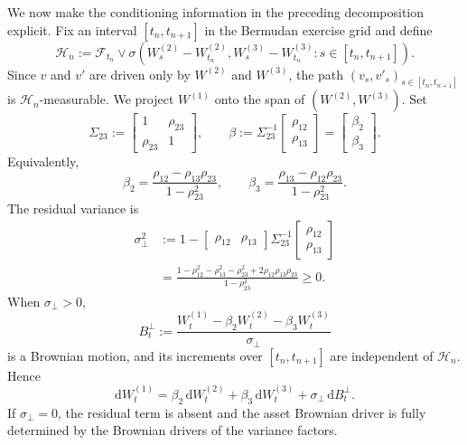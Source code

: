 \documentclass[pdflatex,sn-mathphys-num]{sn-jnl}
\theoremstyle{thmstyleone}%
\theoremstyle{thmstylethree}%
\theoremstyle{thmstyletwo}%
\newcommand{\dd}{\mathrm d}
\newcommand{\F}{\mathcal F}
\begin{document}
We now make the conditioning information in the preceding decomposition explicit.
Fix an interval $[t_n,t_{n+1}]$ in the Bermudan exercise grid and define
$$
\mathcal H_n
:=
\F_{t_n}
\vee
\sigma\!\left(
W_s^{(2)}-W_{t_n}^{(2)},
W_s^{(3)}-W_{t_n}^{(3)}
: s\in[t_n,t_{n+1}]
\right).
$$
Since $v$ and $v'$ are driven only by $W^{(2)}$ and $W^{(3)}$, the path
$(v_s,v'_s)_{s\in[t_n,t_{n+1}]}$ is $\mathcal H_n$-measurable. We project
$W^{(1)}$ onto the span of $(W^{(2)},W^{(3)})$. Set
$$
\Sigma_{23}:=
\begin{bmatrix}
1 & \rho_{23}\\
\rho_{23} & 1
\end{bmatrix},
\qquad
\beta:=\Sigma_{23}^{-1}
\begin{bmatrix}
\rho_{12}\\
\rho_{13}
\end{bmatrix}
=
\begin{bmatrix}
\beta_2\\
\beta_3
\end{bmatrix}.
$$
Equivalently,
\begin{equation}\label{eq:proj-coeffs}
\beta_2=\frac{\rho_{12}-\rho_{13}\rho_{23}}{1-\rho_{23}^2},
\qquad
\beta_3=\frac{\rho_{13}-\rho_{12}\rho_{23}}{1-\rho_{23}^2}.
\end{equation}
The residual variance is
\begin{equation}\label{eq:sigperp}
\begin{aligned}
\sigma_\perp^2
&:=
1-
\begin{bmatrix}\rho_{12}&\rho_{13}\end{bmatrix}
\Sigma_{23}^{-1}
\begin{bmatrix}\rho_{12}\\ \rho_{13}\end{bmatrix} \\
&=
\frac{
1-\rho_{12}^2-\rho_{13}^2-\rho_{23}^2
+2\rho_{12}\rho_{13}\rho_{23}
}{1-\rho_{23}^2}
\ge0 .
\end{aligned}
\end{equation}
When $\sigma_\perp>0$,
$$
B_t^\perp
:=
\frac{W_t^{(1)}-\beta_2W_t^{(2)}-\beta_3W_t^{(3)}}{\sigma_\perp}
$$
is a Brownian motion, and its increments over $[t_n,t_{n+1}]$ are independent
of $\mathcal H_n$. Hence
\begin{equation}\label{eq:orth}
\dd W_t^{(1)}
=\beta_2\,\dd W_t^{(2)}
+\beta_3\,\dd W_t^{(3)}
+\sigma_\perp\,\dd B_t^\perp.
\end{equation}
If $\sigma_\perp=0$, the residual term is absent and the asset Brownian driver
is fully determined by the Brownian drivers of the variance factors.
\end{document}
